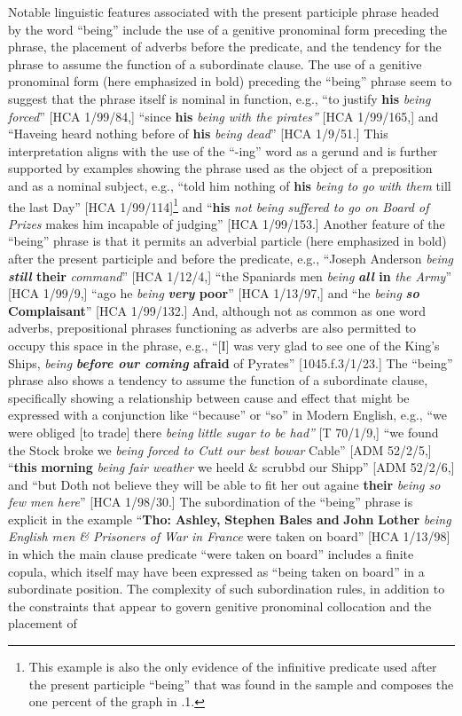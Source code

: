   Notable linguistic features associated with the present participle phrase headed by the word “being” include the use of a genitive pronominal form preceding the phrase, the placement of adverbs before the predicate, and the tendency for the phrase to assume the function of a subordinate clause. The use of a genitive pronominal form (here emphasized in bold) preceding the “being” phrase seem to suggest that the phrase itself is nominal in function, e.g., “to justify \textbf{his} \textit{being forced}” [HCA 1/99/84,] “since \textbf{his} \textit{being with the pirates”} [HCA 1/99/165,] and “Haveing heard nothing before of \textbf{his} \textit{being dead}” [HCA 1/9/51.] This interpretation aligns with the use of the “-ing” word as a gerund and is further supported by examples showing the phrase used as the object of a preposition and as a nominal subject, e.g., “told him nothing of \textbf{his} \textit{being to go with them} till the last Day” [HCA 1/99/114]\footnote{This example is also the only evidence of the infinitive predicate used after the present participle “being” that was found in the sample and composes the one percent of the graph in .1.}  and “\textbf{his} \textit{not being suffered to go on Board of Prizes} makes him incapable of judging” [HCA 1/99/153.]  Another feature of the “being” phrase is that it permits an adverbial particle (here emphasized in bold) after the present participle and before the predicate, e.g., “Joseph Anderson \textit{being} \textbf{\textit{still} their} \textit{command}” [HCA 1/12/4,] “the Spaniards men \textit{being} \textbf{\textit{all} in} \textit{the Army}” [HCA 1/99/9,] “ago he \textit{being} \textbf{\textit{very} poor}” [HCA 1/13/97,] and “he \textit{being} \textbf{\textit{so} Complaisant}” [HCA 1/99/132.] And, although not as common as one word adverbs, prepositional phrases functioning as adverbs are also permitted to occupy this space in the phrase, e.g., “[I] was very glad to see one of the King’s Ships, \textit{being} \textbf{\textit{before our coming} afraid} of Pyrates” [1045.f.3/1/23.] The “being” phrase also shows a tendency to assume the function of a subordinate clause, specifically showing a relationship between cause and effect that might be expressed with a conjunction like “because” or “so” in Modern English, e.g., “we were obliged [to trade] there \textit{being little sugar to be had”} [T 70/1/9,] “we found the Stock broke we \textit{being forced to Cutt our best bowar} Cable” [ADM 52/2/5,] “\textbf{this} \textbf{morning} \textit{being fair weather} we heeld \& scrubbd our Shipp” [ADM 52/2/6,] and “but Doth not believe they will be able to fit her out againe \textbf{their} \textit{being so few men here}” [HCA 1/98/30.] The subordination of the “being” phrase is explicit in the example “\textbf{Tho:} \textbf{Ashley,} \textbf{Stephen} \textbf{Bales} \textbf{and} \textbf{John} \textbf{Lother} \textit{being English men \& Prisoners of War in France} were taken on board” [HCA 1/13/98] in which the main clause predicate “were taken on board” includes a finite copula, which itself may have been expressed as “being taken on board” in a subordinate position. The complexity of such subordination rules, in addition to the constraints that appear to govern genitive pronominal collocation and the placement of 